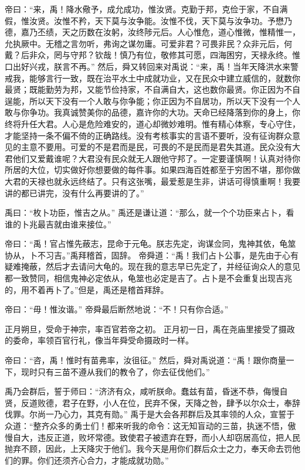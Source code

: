 \documentclass[a4paper,12pt,UTF8,twoside]{ctexbook}
\begin{document}
帝曰：“来，禹！降水儆予，成允成功，惟汝贤。克勤于邦，克俭于家，不自满假，惟汝贤。汝惟不矜，天下莫与汝争能。汝惟不伐，天下莫与汝争功。予懋乃德，嘉乃丕绩，天之历数在汝躬，汝终陟元后。人心惟危，道心惟微，惟精惟一，允执厥中。无稽之言勿听，弗询之谋勿庸。可爱非君？可畏非民？众非元后，何戴？后非众，罔与守邦？钦哉！慎乃有位，敬修其可愿，四海困穷，天禄永终。惟口出好兴戎，朕言不再。”
然后，舜又转回来对禹说：“来，禹！当年天降洪水来警戒我，能够言行一致，既在治平水土中成就功业，又在民众中建立威信的，就数你最贤；既能勤劳为邦，又能节俭持家，不自满自大，这也数你最贤。你正因为不自逞能，所以天下没有一个人敢与你争能；你正因为不自居功，所以天下没有一个人敢与你争功。我真诚赞美你的品德，嘉许你的大功。天命已经降落到你的身上，你终将升任大君。人心是危险难安的，道心却微妙难明。惟有精心体察，专心守住，才能坚持一条不偏不倚的正确路线。没有考核事实的言语不要听，没有征询群众意见的主意不要用。可爱的不是君而是民，可畏的不是民而是君失其道。民众没有大君他们又爱戴谁呢？大君没有民众就无人跟他守邦了。一定要谨慎啊！认真对待你所居的大位，切实做好你想要做的每件事。如果四海百姓都至于穷困不堪，那你做大君的天禄也就永远终结了。只有这张嘴，最爱惹是生非，讲话可得慎重啊！我要讲的都已讲完，没有什么再要讲的了。”

禹曰：“枚卜功臣，惟吉之从。”
禹还是谦让道：“那么，就一个个功臣来占卜，看谁的卜兆最吉就由谁来接位。”

帝曰：“禹！官占惟先蔽志，昆命于元龟。朕志先定，询谋佥同，鬼神其依，龟筮协从，卜不习吉。”禹拜稽首，固辞。
帝舜道：“禹！我们占卜公事，是先由于心有疑难掩蔽，然后才去请问大龟的。现在我的意志早已先定了，并经征询众人的意见都一致赞同，相信鬼神必定依从，龟筮也必定是吉了。占卜是不会重复出现吉兆的，用不着再卜了。”但是，禹还是稽首拜辞。

帝曰：“毋！惟汝谐。”
帝舜最后断然地说：“不！只有你合适。”

正月朔旦，受命于神宗，率百官若帝之初。
正月初一日，禹在尧庙里接受了摄政的委命，率领百官行礼，像当年舜受命摄政时一样。

帝曰：“咨，禹！惟时有苗弗率，汝徂征。”
然后，舜对禹说道：“禹！跟你商量一下，现时只有三苗不遵从我们的教令了，你去征伐他们。”

禹乃会群后，誓于师曰：“济济有众，咸听朕命。蠢兹有苗，昏迷不恭，侮慢自贤，反道败德，君子在野，小人在位，民弃不保，天降之咎，肆予以尔众士，奉辞伐罪。尔尚一乃心力，其克有勋。”
禹于是大会各邦群后及其率领的人众，宣誓于众道：“整齐众多的勇士们！都来听我的命令：这无知盲动的三苗，执迷不悟，傲慢自大，违反正道，败坏常德。致使君子被遗弃在野，而小人却窃居高位，把人民抛弃不顾，因此，上天降灾于他们。我今天是用你们群后众士之力，奉天命去罚他们的罪。你们还须齐心合力，才能成就功勋。”
\end{document}
